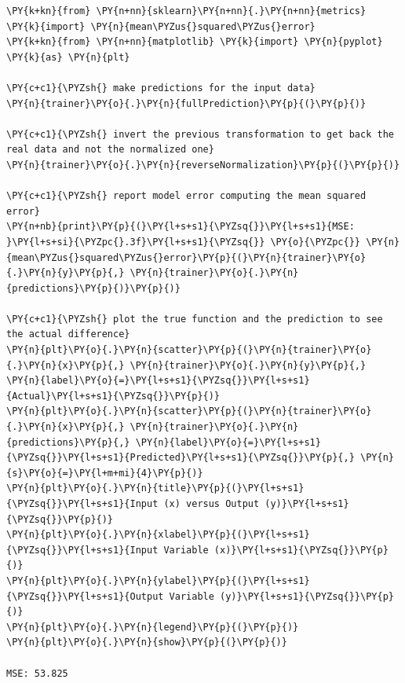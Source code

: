     \begin{tcolorbox}[breakable, size=fbox, boxrule=1pt, pad at break*=1mm,colback=cellbackground, colframe=cellborder]
\begin{Verbatim}[commandchars=\\\{\}]
\PY{k+kn}{from} \PY{n+nn}{sklearn}\PY{n+nn}{.}\PY{n+nn}{metrics} \PY{k}{import} \PY{n}{mean\PYZus{}squared\PYZus{}error}
\PY{k+kn}{from} \PY{n+nn}{matplotlib} \PY{k}{import} \PY{n}{pyplot} \PY{k}{as} \PY{n}{plt}

\PY{c+c1}{\PYZsh{} make predictions for the input data}
\PY{n}{trainer}\PY{o}{.}\PY{n}{fullPrediction}\PY{p}{(}\PY{p}{)}

\PY{c+c1}{\PYZsh{} invert the previous transformation to get back the real data and not the normalized one}
\PY{n}{trainer}\PY{o}{.}\PY{n}{reverseNormalization}\PY{p}{(}\PY{p}{)}

\PY{c+c1}{\PYZsh{} report model error computing the mean squared error}
\PY{n+nb}{print}\PY{p}{(}\PY{l+s+s1}{\PYZsq{}}\PY{l+s+s1}{MSE: }\PY{l+s+si}{\PYZpc{}.3f}\PY{l+s+s1}{\PYZsq{}} \PY{o}{\PYZpc{}} \PY{n}{mean\PYZus{}squared\PYZus{}error}\PY{p}{(}\PY{n}{trainer}\PY{o}{.}\PY{n}{y}\PY{p}{,} \PY{n}{trainer}\PY{o}{.}\PY{n}{predictions}\PY{p}{)}\PY{p}{)}

\PY{c+c1}{\PYZsh{} plot the true function and the prediction to see the actual difference}
\PY{n}{plt}\PY{o}{.}\PY{n}{scatter}\PY{p}{(}\PY{n}{trainer}\PY{o}{.}\PY{n}{x}\PY{p}{,} \PY{n}{trainer}\PY{o}{.}\PY{n}{y}\PY{p}{,} \PY{n}{label}\PY{o}{=}\PY{l+s+s1}{\PYZsq{}}\PY{l+s+s1}{Actual}\PY{l+s+s1}{\PYZsq{}}\PY{p}{)}
\PY{n}{plt}\PY{o}{.}\PY{n}{scatter}\PY{p}{(}\PY{n}{trainer}\PY{o}{.}\PY{n}{x}\PY{p}{,} \PY{n}{trainer}\PY{o}{.}\PY{n}{predictions}\PY{p}{,} \PY{n}{label}\PY{o}{=}\PY{l+s+s1}{\PYZsq{}}\PY{l+s+s1}{Predicted}\PY{l+s+s1}{\PYZsq{}}\PY{p}{,} \PY{n}{s}\PY{o}{=}\PY{l+m+mi}{4}\PY{p}{)}
\PY{n}{plt}\PY{o}{.}\PY{n}{title}\PY{p}{(}\PY{l+s+s1}{\PYZsq{}}\PY{l+s+s1}{Input (x) versus Output (y)}\PY{l+s+s1}{\PYZsq{}}\PY{p}{)}
\PY{n}{plt}\PY{o}{.}\PY{n}{xlabel}\PY{p}{(}\PY{l+s+s1}{\PYZsq{}}\PY{l+s+s1}{Input Variable (x)}\PY{l+s+s1}{\PYZsq{}}\PY{p}{)}
\PY{n}{plt}\PY{o}{.}\PY{n}{ylabel}\PY{p}{(}\PY{l+s+s1}{\PYZsq{}}\PY{l+s+s1}{Output Variable (y)}\PY{l+s+s1}{\PYZsq{}}\PY{p}{)}
\PY{n}{plt}\PY{o}{.}\PY{n}{legend}\PY{p}{(}\PY{p}{)}
\PY{n}{plt}\PY{o}{.}\PY{n}{show}\PY{p}{(}\PY{p}{)}

MSE: 53.825
    \end{Verbatim}
\end{tcolorbox}

    \begin{center}
    \end{center}
    
